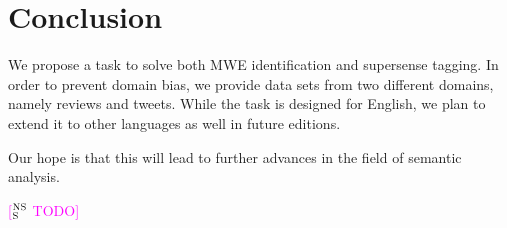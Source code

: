 \documentclass[11pt]{article}
\newcommand{\ensuretext}[1]{#1}
\newcommand{\nssmarker}{\ensuretext{\textcolor{magenta}{\ensuremath{^{\textsc{NS}}_{\textsc{S}}}}}}
\newcommand{\arkcomment}[3]{\ensuretext{\textcolor{#3}{[#1 #2]}}}
\newcommand{\nss}[1]{\arkcomment{\nssmarker}{#1}{magenta}}
\begin{document}
\begin{table*}
\centering\small
{}
\caption{Evaluation of baseline systems. For \textsc{Tweets}, ``MWE'' is placed in scare quotes 
because we have not yet systematically annotated the data for MWEs, so this preliminary evaluation 
is against supersense annotators' chunking decisions for noun and verb expressions.}
\label{tbl:baselines}
\end{table*}

\section{Conclusion}
We propose a task to solve both MWE identification and supersense tagging. In order to prevent domain bias, we provide data sets from two different domains, namely reviews and tweets. While the task is designed for English, we plan to extend it to other languages as well in future editions.

Our hope is that this will lead to further advances in the field of semantic analysis.

\nss{TODO}
\end{document}
